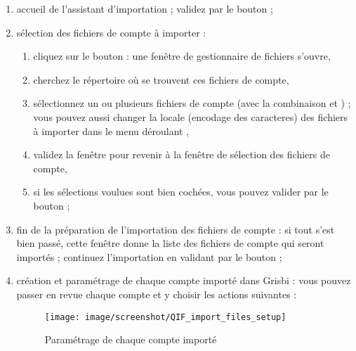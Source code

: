 \begin{enumerate}
	\item accueil de l'assistant d'importation ; validez par le bouton  ;
	\item sélection des fichiers de compte à importer :	
		\begin{enumerate}
			\item cliquez sur le bouton  : une fenêtre de gestionnaire de fichiers s'ouvre,	
			\item cherchez le répertoire où se trouvent ces fichiers de compte,
			\item sélectionnez un ou plusieurs fichiers de compte (avec la combinaison   et ) ; vous pouvez aussi changer la \gls{locale} (\gls{encodage des caracteres}) des fichiers à importer dans le menu déroulant ,
			\item validez la fenêtre pour revenir à la fenêtre de sélection des fichiers de compte,
			\item si les sélections voulues sont bien cochées, vous pouvez valider par le bouton  ;
		\end{enumerate}		  
	\item fin de la préparation de l'importation des fichiers de compte : si tout s'est bien passé, cette fenêtre donne la liste des fichiers de compte qui seront importés ; continuez l'importation en validant par le bouton  ;
	\item création et paramétrage de chaque compte importé dans Grisbi : vous pouvez passer en revue chaque compte et y choisir les actions suivantes
	 :
	\begin{figure}[htbp]
	\begin{center}
	\texttt{[image: image/screenshot/QIF\_import\_files\_setup]}
	\end{center}
	\caption{Paramétrage de chaque compte importé}
	\label{QIF-import-files-setup-img}
	\end{figure}
	

\end{enumerate}
